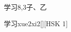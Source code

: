 \begin{entry}{学习}{8,3}{⼦、⼄}
  \begin{phonetics}{学习}{xue2xi2}[][HSK 1]
  \end{phonetics}
\end{entry}
